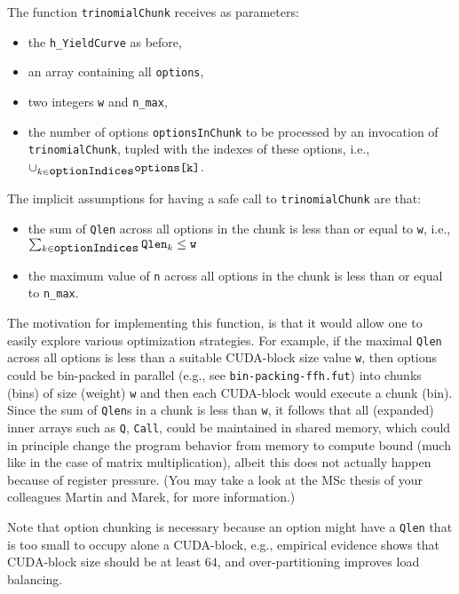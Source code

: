 \documentclass[a4paper,11pt]{article}
\begin{document}
The function {\tt trinomialChunk} receives as parameters:
\begin{itemize}
    \item the {\tt h\_YieldCurve} as before,
    \item an array containing all {\tt options},
    \item two integers {\tt w} and {\tt n\_max},
    \item the number of options {\tt optionsInChunk} to 
            be processed by an invocation of 
            {\tt trinomialChunk}, tupled with the
            indexes of these options, i.e., 
            $\cup_{k\in\mbox{\tt optionIndices}} \mbox{\tt options[k]}$.
\end{itemize}

The implicit assumptions for having a safe call to {\tt trinomialChunk} are that:
\begin{itemize}
    \item the sum of {\tt Qlen} across all options in the chunk is less than
            or equal to {\tt w}, i.e.,\\ 
            $\sum_{k\in\mbox{\tt optionIndices}}\mbox{\tt Qlen}_k \leq \mbox{\tt w}$
    \item the maximum value of {\tt n} across all options in the chunk is less than
            or equal to {\tt n\_max}.
\end{itemize}

The motivation for implementing this function, is that it would allow
one to easily explore various optimization strategies. For example, if 
the maximal {\tt Qlen} across all options is less than a suitable
CUDA-block size value {\tt w}, then options could be bin-packed 
in parallel (e.g., see {\tt bin-packing-ffh.fut}) into chunks
(bins) of size (weight) {\tt w} and then each CUDA-block would
execute a chunk (bin). Since the sum of {\tt Qlen}s in a chunk is 
less than {\tt w}, it follows that all (expanded) inner arrays such as 
{\tt Q}, {\tt Call}, could be maintained in shared memory, which
could in principle change the program behavior from memory to compute 
bound (much like in the case of matrix multiplication), albeit this
does not actually happen because of register pressure.
(You may take a look at the MSc thesis of your colleagues Martin and 
Marek, for more information.) 

Note that option chunking is necessary because an option might have
a {\tt Qlen} that is too small to occupy alone a CUDA-block, e.g.,
empirical evidence shows that CUDA-block size should be at least 
$64$, and over-partitioning improves load balancing. 
\end{document}
